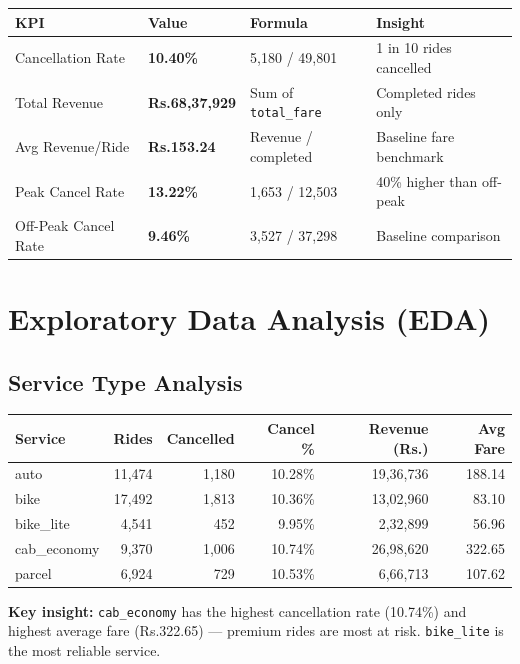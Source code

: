 \documentclass[12pt,a4paper]{article}
\begin{document}
\begin{center}
\begin{tabular}{llll}
\toprule
\textbf{KPI} & \textbf{Value} & \textbf{Formula} & \textbf{Insight} \\
\midrule
Cancellation Rate & \textbf{10.40\%} & 5,180 / 49,801 & 1 in 10 rides cancelled \\
Total Revenue & \textbf{Rs.68,37,929} & Sum of \texttt{total\_fare} & Completed rides only \\
Avg Revenue/Ride & \textbf{Rs.153.24} & Revenue / completed & Baseline fare benchmark \\
Peak Cancel Rate & \textbf{13.22\%} & 1,653 / 12,503 & 40\% higher than off-peak \\
Off-Peak Cancel Rate & \textbf{9.46\%} & 3,527 / 37,298 & Baseline comparison \\
\bottomrule
\end{tabular}
\end{center}

\section{Exploratory Data Analysis (EDA)}

\subsection{Service Type Analysis}
\begin{center}
\begin{tabular}{lrrrrr}
\toprule
\textbf{Service} & \textbf{Rides} & \textbf{Cancelled} & \textbf{Cancel \%} & \textbf{Revenue (Rs.)} & \textbf{Avg Fare} \\
\midrule
auto & 11,474 & 1,180 & 10.28\% & 19,36,736 & 188.14 \\
bike & 17,492 & 1,813 & 10.36\% & 13,02,960 & 83.10 \\
bike\_lite & 4,541 & 452 & 9.95\% & 2,32,899 & 56.96 \\
cab\_economy & 9,370 & 1,006 & 10.74\% & 26,98,620 & 322.65 \\
parcel & 6,924 & 729 & 10.53\% & 6,66,713 & 107.62 \\
\bottomrule
\end{tabular}
\end{center}

\textbf{Key insight:} \texttt{cab\_economy} has the highest cancellation rate (10.74\%) and highest average fare (Rs.322.65) --- premium rides are most at risk. \texttt{bike\_lite} is the most reliable service.
\end{document}
